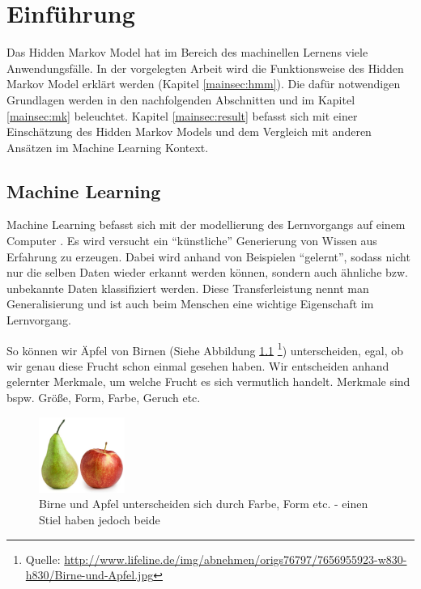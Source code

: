 \chapter{Einführung}

\label{chap:intro}

Das Hidden Markov Model hat im Bereich des machinellen Lernens viele Anwendungsfälle. In der vorgelegten Arbeit wird die Funktionsweise des Hidden Markov Model erklärt werden (Kapitel \ref{mainsec:hmm}). Die dafür notwendigen Grundlagen werden in den nachfolgenden Abschnitten und im Kapitel \ref{mainsec:mk} beleuchtet.
Kapitel \ref{mainsec:result} befasst sich mit einer Einschätzung des Hidden Markov Models und dem Vergleich mit anderen Ansätzen im Machine Learning Kontext.

\section{Machine Learning}
Machine Learning befasst sich mit der modellierung des Lernvorgangs auf einem Computer \cite{marsland}. Es wird versucht ein ``künstliche'' Generierung von Wissen aus Erfahrung zu erzeugen.
Dabei wird anhand von Beispielen ``gelernt'', sodass nicht nur die selben Daten wieder erkannt werden können, sondern auch ähnliche bzw. unbekannte Daten klassifiziert werden. Diese Transferleistung nennt man Generalisierung und ist auch beim Menschen eine wichtige Eigenschaft im Lernvorgang.

So können wir Äpfel von Birnen (Siehe Abbildung \ref{fig:apfelbirne} \footnote{Quelle: \url{http://www.lifeline.de/img/abnehmen/origs76797/7656955923-w830-h830/Birne-und-Apfel.jpg}}) unterscheiden, egal, ob wir genau diese Frucht schon einmal gesehen haben. Wir entscheiden anhand gelernter Merkmale, um welche Frucht es sich vermutlich handelt. Merkmale sind bspw. Größe, Form, Farbe, Geruch etc.

\begin{figure}[htbp] \centering
    \includegraphics[width=0.25\textwidth]{Bilder/Kap1/birneapfel}
    \caption{ Birne und Apfel unterscheiden sich durch Farbe, Form etc. - einen Stiel haben jedoch beide}
    \label{fig:apfelbirne}
\end{figure}


